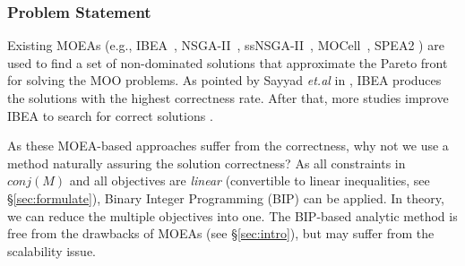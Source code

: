 \subsubsection{Problem Statement}

Existing MOEAs (e.g., IBEA~\cite{DBLP:conf/ppsn/ZitzlerK04}, NSGA-II~\cite{DBLP:journals/tec/BradstreetWB08}, ssNSGA-II~\cite{coello2004applications}, MOCell~\cite{miettinen1999nonlinear}, SPEA2 \cite{Zitzler01spea2:improving})  are used to find a set of non-dominated solutions that approximate the Pareto front for solving the MOO problems. %
As pointed by Sayyad \emph{et.al} in \cite{DBLP:conf/icse/SayyadMA13}, IBEA produces the solutions with the highest correctness rate. After that, more studies improve IBEA to search for correct solutions \cite{conf/cmsbse/SayyadMA13}\cite{DBLP:conf/issta/TanXCSLD15}\cite{DBLP:conf/icse/HenardPHT15}\cite{DBLP:journals/tosem/HieronsLLSZ16}\cite{DBLP:journals/asc/XueZT0CC016}.


 As these MOEA-based approaches suffer from the correctness, %
why not we use a method naturally assuring the solution correctness?   As all constraints in $conj(M)$  and all objectives are \emph{linear} (convertible to linear inequalities, see \S\ref{sec:formulate}),  Binary Integer Programming (BIP) can be applied. In theory, we can reduce the multiple objectives into one. The BIP-based analytic method is free from the drawbacks of MOEAs (see \S\ref{sec:intro}), but may suffer from the scalability issue. %



